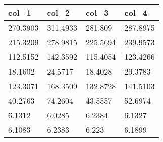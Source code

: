 \begin{tabular}{llll}
col_1 & col_2 & col_3 & col_4 \\ 
\hline 
270.3903 & 311.4933 & 281.809 & 287.8975 \\ 
215.3209 & 278.9815 & 225.5694 & 239.9573 \\ 
112.5152 & 142.3592 & 115.4054 & 123.4266 \\ 
18.1602 & 24.5717 & 18.4028 & 20.3783 \\ 
123.3071 & 168.3509 & 132.8728 & 141.5103 \\ 
40.2763 & 74.2604 & 43.5557 & 52.6974 \\ 
6.1312 & 6.0285 & 6.2384 & 6.1327 \\ 
6.1083 & 6.2383 & 6.223 & 6.1899 \\ 
\hline 
\end{tabular}